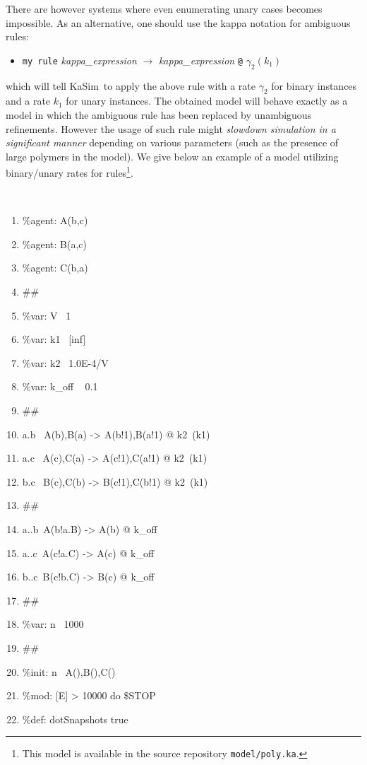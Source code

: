 \documentclass[11pt]{book}
\def\KaSim{\textsf{KaSim}}
\def\ttt#1{\texttt{#1}}
\def\var#1{\textquotesingle #1\textquotesingle}
\def\rar{\rightarrow}
\def\ga{\gamma}
\def\ITE#1{\begin{itemize}#1\end{itemize}}
\begin{document}
There are however systems where even enumerating unary cases becomes impossible. As an alternative, one should use the kappa notation for ambiguous rules: 
\ITE{
\item[] \ttt{\textquotesingle my rule\textquotesingle } {\it kappa\_expression} $\rar$ {\it kappa\_expression} \ttt{@} $\ga_2(k_1)$  
}
which will tell \KaSim~to apply the above rule with a rate $\ga_2$ for binary instances and a rate $k_1$ for unary instances. The obtained model will behave exactly as a model in which the ambiguous rule has been replaced by unambiguous refinements. However the usage of such rule might \emph{slowdown simulation in a significant manner} depending on various parameters (such as the presence of large polymers in the model). We give below an example of a model utilizing binary/unary rates for rules\footnote{This model is available in the source repository \ttt{model/poly.ka}.}.

{\tt\footnotesize
\begin{enumerate}
\item \%agent: A(b,c)
\item \%agent: B(a,c)
\item \%agent: C(b,a)
\item \#\#
\item \%var: \var{V}~  1
\item \%var: \var{k1}~  [inf]
\item \%var: \var{k2}~ 1.0E-4/\var{V} 
\item \%var: \var{k\_off} ~ 0.1
\item \#\#
\item \var{a.b}~ A(b),B(a) -> A(b!1),B(a!1) @ \var{k2}~(\var{k1})
\item \var{a.c}~ A(c),C(a) -> A(c!1),C(a!1) @ \var{k2}~(\var{k1})
\item \var{b.c}~ B(c),C(b) -> B(c!1),C(b!1) @ \var{k2}~(\var{k1})
\item \#\#
\item \var{a..b}~A(b!a.B) -> A(b) @ \var{k\_off} 
\item \var{a..c}~A(c!a.C) -> A(c) @ \var{k\_off}
\item \var{b..c}~B(c!b.C) -> B(c) @ \var{k\_off} 
\item \#\#
\item \%var: \var{n}~  1000
\item \#\#
\item \%init: \var{n}~  A(),B(),C()
\item \%mod: [E] > 10000 do \$STOP 
\item \%def: \var{\var{dotSnapshots}} \var{\var{true}}
\end{enumerate}
}
\end{document}
